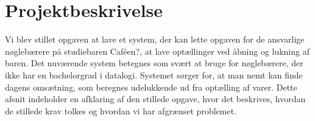 \documentclass[]{article}
\begin{document}
    \thispagestyle{empty}


    \newpage
    
\cleardoublepage
{}
\tableofcontents
\listoffigures
\listoftables \vspace*{2cm}

 \vspace*{0.3cm}

\cleardoublepage

\newpage
{}

\section{Projektbeskrivelse} \label{Projektbeskrivelse}
Vi blev stillet opgaven at lave et system, der kan lette opgaven for de ansvarlige nøglebærere på studiebaren Caféen?, at lave optællinger ved åbning og lukning af baren. Det nuværende system betegnes som svært at bruge for nøglebærere, der ikke har en bachelorgrad i datalogi. Systemet sørger for, at man nemt kan finde dagens omsætning, som beregnes udelukkende ud fra optælling af varer. Dette afsnit indeholder en afklaring af den stillede opgave, hvor det beskrives, hvordan de stillede krav tolkes og hvordan vi har afgrænset problemet.
\end{document}
